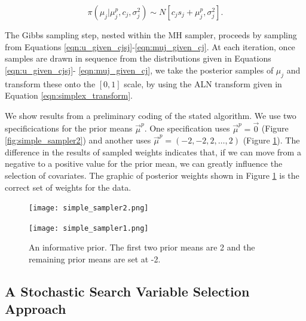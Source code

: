 \begin{equation}\label{eqn:muj_given_cj}
\pi(\mu_j\vert \mu_j^p, c_j, \sigma^2_j)\sim N[c_js_j+\mu_j^p, \sigma_j^2].
\end{equation}

 The Gibbs sampling step, nested within the MH sampler, proceeds by sampling from Equations \ref{eqn:u_given_cjsj}-\ref{eqn:muj_given_cj}.
At each iteration, once samples are drawn in sequence from the distributions given in Equations \ref{eqn:u_given_cjsj}- \ref{eqn:muj_given_cj}, we take the posterior samples of $\mu_j$ and transform these onto the $[0,1]$ scale, by using the ALN transform given in Equation \ref{eqn:simplex_transform}. 

We show results from a preliminary coding of the stated algorithm. We use two specificications for the prior means $\vec{\mu}^p$. One specification uses  $\vec{\mu}^p = \vec{0}$ (Figure \ref{fig:simple_sampler2}) and another uses $\vec{\mu}^p=(-2,-2,2,\dots,2)$ (Figure \ref{fig:simple_sampler1}). The difference in the results of sampled weights indicates that, if we can move from a negative to a positive value for the prior mean, we can greatly influence the selection of covariates. The graphic of posterior weights shown in Figure \ref{fig:simple_sampler1} is the correct set of weights for the data. 



 \begin{figure}[ht]
\begin{minipage}[b]{0.45\linewidth}
\centering
\texttt{[image: simple\_sampler2.png]}
\caption[Results for the zero mean prior]{A zero mean prior. Note that the two covariates that should have large probabilities are covariates 1 and 2.}
\label{fig:simple_sampler2}
\end{minipage}
\hspace{0.5cm}
\begin{minipage}[b]{0.45\linewidth}
\centering
\texttt{[image: simple\_sampler1.png]}
\caption[Results for the informative prior]{An informative prior. The first two prior means are 2 and the remaining prior means are set at -2.}
\label{fig:simple_sampler1}
\end{minipage}
\end{figure}



\subsection{A Stochastic Search Variable Selection Approach}\label{sec:PX_1}

